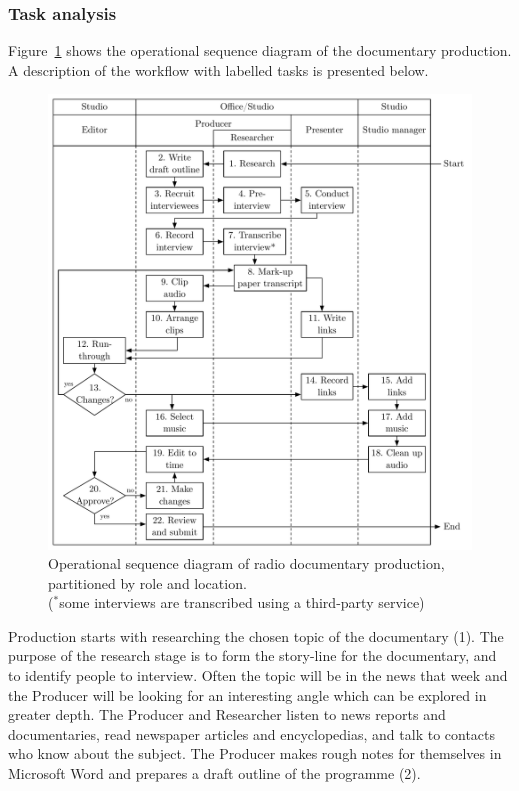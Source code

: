 \subsubsection{Task analysis}
Figure~\ref{fig:ethno-docs-workflow} shows the operational sequence diagram of the documentary production.  A
description of the workflow with labelled tasks is presented below.

\begin{figure}
  \centering
  \includegraphics[width=\columnwidth]{figs/docs-workflow.pdf}
  \caption{Operational sequence diagram of radio documentary production, partitioned by role and location.\\
  {\footnotesize ($^{*}$some interviews are transcribed using a third-party service)}}
  \label{fig:ethno-docs-workflow}
\end{figure}

Production starts with researching the chosen topic of the documentary (1).  The purpose of the research stage is to
form the story-line for the documentary, and to identify people to interview.  Often the topic will be in the news that
week and the Producer will be looking for an interesting angle which can be explored in greater depth.  The Producer
and Researcher listen to news reports and documentaries, read newspaper articles and encyclopedias, and talk to
contacts who know about the subject.  The Producer makes rough notes for themselves in Microsoft Word and prepares a
draft outline of the programme (2).

